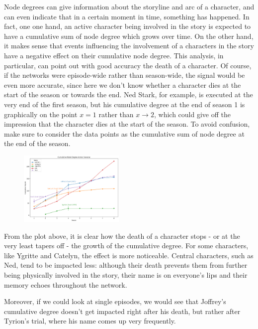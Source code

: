 \documentclass[10pt,twocolumn,letterpaper]{article}
\begin{document}
Node degrees can give information about the storyline and arc of a character, and can even indicate that in a certain moment in time, something has happened.
In fact, one one hand, an active character being involved in the story is expected to have a cumulative sum of node degree which grows over time. On the other hand, it makes sense that events influencing the involvement of a characters in the story have a negative effect on their cumulative node degree. This analysis, in particular, can point out with good accuracy the death of a character. Of course, if the networks were episode-wide rather than season-wide, the signal would be even more accurate, since here we don't know whether a character dies at the start of the season or towards the end. Ned Stark, for example, is executed at the very end of the first season, but his cumulative degree at the end of season 1 is graphically on the point $x=1$ rather than $x\xrightarrow{}2$, which could give off the impression that the character dies at the start of the season. To avoid confusion, make sure to consider the data points as the cumulative sum of node degree at the end of the season. 

\begin{figure}[!h]
    \centering
    \includegraphics[width=0.45\textwidth]{img/all_seasons/csum_degree.jpg}
\end{figure}

From the plot above, it is clear how the death of a character stops - or at the very least tapers off - the growth of the cumulative degree. For some characters, like Ygritte and Catelyn, the effect is more noticeable. Central characters, such as Ned, tend to be impacted less: although their death prevents them from further being physically involved in the story, their name is on everyone's lips and their memory echoes throughout the network.

Moreover, if we could look at single episodes, we would see that Joffrey's cumulative degree doesn't get impacted right after his death, but rather after Tyrion's trial, where his name comes up very frequently.
\end{document}
